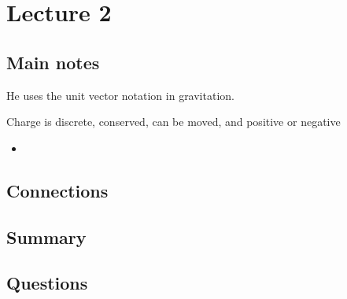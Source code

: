 \section{Lecture 2}

\subsection{Main notes}

He uses the unit vector notation in gravitation.

Charge is discrete, conserved, can be moved, and positive or negative
\begin{itemize}
	\item
\end{itemize}


\subsection{Connections}


\subsection{Summary}


\subsection{Questions}
